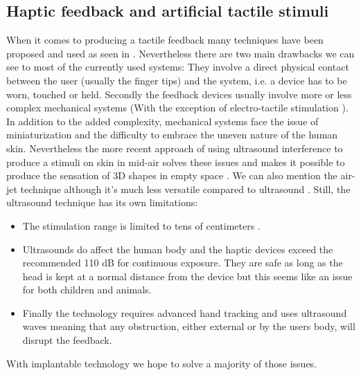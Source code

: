 \documentclass[10pt,journal,compsoc]{IEEEtran}
\begin{document}
\subsection{Haptic feedback and artificial tactile stimuli}
When it comes to producing a tactile feedback many techniques have been proposed and used as seen in \cite{benali2004isr}. Nevertheless there are two main drawbacks we can see to most of the currently used systems:
	They involve a direct physical contact between the user (usually the finger tips) and the system, i.e. a device has to be worn, touched or held.
	Secondly the feedback devices usually involve more or less complex mechanical systems (With the exception of electro-tactile stimulation \cite{kaezmarek1991tbe}). In addition to the added complexity, mechanical systems face the issue of miniaturization and the difficulty to embrace the uneven nature of the human skin.
	Nevertheless the more recent approach of using ultrasound interference to produce a stimuli on skin in mid-air \cite{carter2013uist} solves these issues and makes it possible to produce the sensation of 3D shapes in empty space \cite{sasia2014acm}. We can also mention the air-jet technique although it's much less versatile compared to ultrasound \cite{arafsha2015book}. Still, the ultrasound technique has its own limitations:
	\begin{itemize}
	\item The stimulation range is limited to tens of centimeters \cite{long2014acm}.
	\item Ultrasounds do affect the human body and the haptic devices exceed the recommended 110 dB for continuous exposure. They are safe as long as the head is kept at a normal distance from the device \cite{long2014acm} but this seems like an issue for both children and animals.
	\item Finally the technology requires advanced hand tracking and uses ultrasound waves meaning that any obstruction, either external or by the users body, will disrupt the feedback.
	\end{itemize}
	
	With implantable technology we hope to solve a majority of those issues.
	
\end{document}

